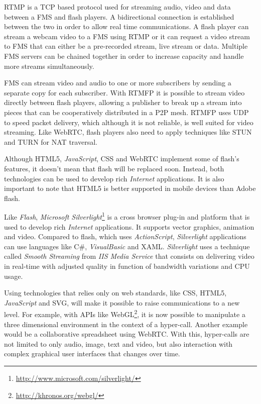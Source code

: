   \ac{RTMP} is a \ac{TCP} based protocol used for streaming audio, video and data between a \ac{FMS} and flash players. A bidirectional connection is established between the two in order to allow real time communications. A flash player can stream a webcam video to a \ac{FMS} using \ac{RTMP} or it can request a video stream to \ac{FMS} that can either be a pre-recorded stream, live stream or data. Multiple \ac{FMS} servers can be chained together in order to increase capacity and handle more streams simultaneously.

  \ac{FMS} can stream video and audio to one or more subscribers by sending a separate copy for each subscriber. With \ac{RTMFP} it is possible to stream video directly between flash players, allowing a publisher to break up a stream into pieces that can be cooperatively distributed in a P2P mesh. \ac{RTMFP} uses \ac{UDP} to speed packet delivery, which although it is not reliable, is well suited for video streaming. Like \ac{WebRTC}, flash players also need to apply techniques like \ac{STUN} and \ac{TURN} for \ac{NAT} traversal.

  Although \ac{HTML}5, \emph{JavaScript}, \ac{CSS} and \ac{WebRTC} implement some of flash's features, it doesn't mean that flash will be replaced soon.
  Instead, both technologies can be used to develop rich \emph{Internet} applications.
  It is also important to note that \ac{HTML}5 is better supported in mobile devices than Adobe flash. 

  Like \emph{Flash}, \emph{Microsoft Silverlight}\footnote{\url{http://www.microsoft.com/silverlight/}} is a cross browser plug-in and platform that is used to develop rich \emph{Internet} applications. It supports vector graphics, animation and video. Compared to flash, which uses \emph{ActionScript}, \emph{Silverlight} applications can use languages like C\#, \emph{VisualBasic} and \ac{XAML}. \emph{Silverlight} uses a technique called \emph{Smooth Streaming} from \emph{IIS Media Service} that consists on delivering video in real-time with adjusted quality in function of bandwidth variations and \ac{CPU} usage.

  Using technologies that relies only on web standards, like \ac{CSS}, \ac{HTML}5, \emph{JavaScript} and \ac{SVG}, will make it possible to raise communications to a new level.
  For example, with \ac{API}s like WebGL\footnote{\url{http://khronos.org/webgl/}}, it is now possible to manipulate a three dimensional environment in the context of a hyper-call. Another example would be a collaborative spreadsheet using \ac{WebRTC}. With this, hyper-calls are not limited to only audio, image, text and video, but also interaction with complex graphical user interfaces that changes over time.

